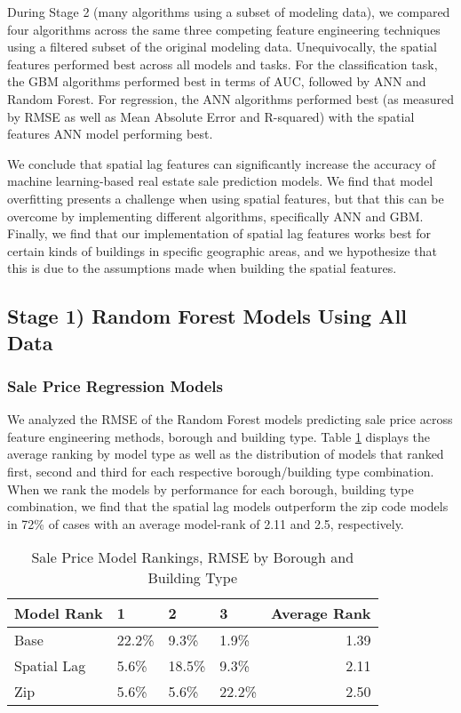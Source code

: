 \documentclass[12pt,]{article}
\begin{document}
During Stage 2 (many algorithms using a subset of modeling data), we
compared four algorithms across the same three competing feature
engineering techniques using a filtered subset of the original modeling
data. Unequivocally, the spatial features performed best across all
models and tasks. For the classification task, the GBM algorithms
performed best in terms of AUC, followed by ANN and Random Forest. For
regression, the ANN algorithms performed best (as measured by RMSE as
well as Mean Absolute Error and R-squared) with the spatial features ANN
model performing best.

We conclude that spatial lag features can significantly increase the
accuracy of machine learning-based real estate sale prediction models.
We find that model overfitting presents a challenge when using spatial
features, but that this can be overcome by implementing different
algorithms, specifically ANN and GBM. Finally, we find that our
implementation of spatial lag features works best for certain kinds of
buildings in specific geographic areas, and we hypothesize that this is
due to the assumptions made when building the spatial features.

\hypertarget{stage-1-random-forest-models-using-all-data}{%
\subsection{Stage 1) Random Forest Models Using All
Data}\label{stage-1-random-forest-models-using-all-data}}

\hypertarget{sale-price-regression-models}{%
\subsubsection{Sale Price Regression
Models}\label{sale-price-regression-models}}

We analyzed the RMSE of the Random Forest models predicting sale price
across feature engineering methods, borough and building type. Table
\ref{tab:SalePriceModelRank} displays the average ranking by model type
as well as the distribution of models that ranked first, second and
third for each respective borough/building type combination. When we
rank the models by performance for each borough, building type
combination, we find that the spatial lag models outperform the zip code
models in 72\% of cases with an average model-rank of 2.11 and 2.5,
respectively.

\begin{table}

\caption{\label{tab:Sale Price Model Rank Distributions}\label{tab:SalePriceModelRank} Sale Price Model Rankings, RMSE by Borough and Building Type}
\centering
\begin{tabular}[t]{llllr}
\toprule
Model Rank & 1 & 2 & 3 & Average Rank\\
\midrule
Base & 22.2\% & 9.3\% & 1.9\% & 1.39\\
Spatial Lag & 5.6\% & 18.5\% & 9.3\% & 2.11\\
Zip & 5.6\% & 5.6\% & 22.2\% & 2.50\\
\bottomrule
\end{tabular}
\end{table}
\end{document}
